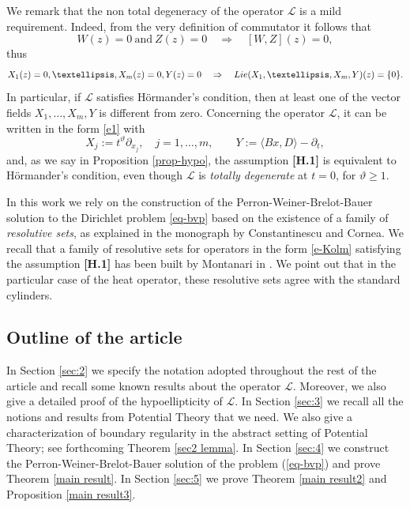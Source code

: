 \documentclass{amsart}
\numberwithin{equation}{section}
\def \Lc{{\mathcal{L}}}
\begin{document}
{We remark that the non total degeneracy of the operator $\Lc$ is a mild requirement. Indeed, from the very definition of commutator it follows that 
\begin{equation*}
	W(z) = 0 \ \text{and} \ Z(z) = 0 \quad \Rightarrow \quad [W,Z] (z) = 0,
\end{equation*}
thus 
\begin{equation*}
  X_1(z) = 0, \ldots, X_m(z) = 0 , Y(z) = 0 \quad \Rightarrow \quad {\rm Lie} (X_1, \ldots, X_m, Y)(z) = \{0 \}.
\end{equation*}
In particular, if $\Lc$ satisfies H\"ormander's condition, then at least one of the vector fields $X_1, \ldots, X_m, Y$ is different from zero. Concerning the operator $\Lc$, it can be written in the form \eqref{e1} with
\begin{equation*}%
 X_j := t^\vartheta \partial_{x_j},\quad j=1,\ldots,m, \qquad Y := \langle B x, D \rangle -\partial_t,
\end{equation*}
and, as we say in Proposition \ref{prop-hypo}, the assumption {\bf[H.1]} is equivalent to H\"ormander's condition, even though $\Lc$ is \textit{totally degenerate} at $t=0$, for $\vartheta \geq 1$.

\vspace{2mm}
In this work we rely on the construction of the {Perron-Weiner-Brelot-Bauer} solution to the Dirichlet problem \eqref{eq-bvp} based on the existence of a family of \textit{resolutive sets}, as explained in the monograph \cite{CC72} by Constantinescu and Cornea. We recall that a family of resolutive sets for operators in the form \eqref{e-Kolm} satisfying the assumption {\bf[H.1]} has been built by Montanari in \cite{Mon96}. We point out that in the particular case of the heat operator, these resolutive sets agree with the standard cylinders.


\subsection*{Outline of the article} In Section \ref{sec:2} we specify the notation adopted throughout the rest of the article and recall some known results about the operator  $\Lc$. Moreover, we also give a detailed proof of the hypoellipticity of $\Lc$. 
In Section \ref{sec:3}  we recall all the notions and results from Potential Theory that we need.
We also give a  characterization of boundary regularity in the abstract setting of Potential Theory; see forthcoming Theorem \ref{sec2 lemma}. In Section \ref{sec:4}  we  construct the {{Perron-Weiner-Brelot-Bauer}} solution of the problem (\ref{eq-bvp})
and prove Theorem \ref {main result}. In Section \ref{sec:5}  we prove Theorem \ref{main result2} and  Proposition \ref{main result3}. 

}
\end{document}
